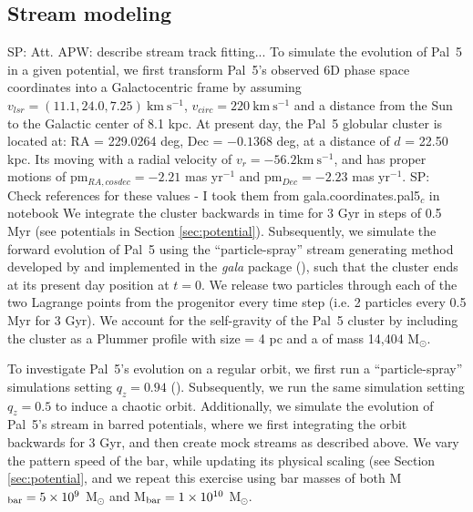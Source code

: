 \documentclass[twocolumn]{aastex62}
\newcommand{\package}[1]{\textsl{#1}}
\newcommand{\msun}{\textrm{M}_\odot}
\newcommand{\kms}{\ensuremath{\textrm{km}~\textrm{s}^{-1}}}
\newcommand{\sa}[1]{{\color{magenta} SP: #1}}
\begin{document}
\subsection{Stream modeling}
\label{sec:modeling}
\sa{Att. APW: describe stream track fitting...}
To simulate the evolution of Pal~5 in a given potential, we first transform Pal~5's observed 6D phase space coordinates into a Galactocentric frame by assuming $v_{lsr} = (11.1, 24.0, 7.25) ~\kms$,  $v_{circ} = 220  ~\kms$ and a distance from the Sun to the Galactic center of 8.1 kpc.
At present day, the Pal~5 globular cluster is located at: RA = 229.0264 deg, Dec = $-0.1368$ deg, at a distance of $d$ = 22.50 kpc. Its moving with a radial velocity of $v_r = -56.2 \kms$, and has proper motions of pm$_{RA,cosdec}= -2.21$ mas yr$^{-1}$ and pm$_{Dec} = -2.23$ mas yr$^{-1}$. \sa{Check references for these values - I took them from gala.coordinates.pal5$_c$ in notebook}
We integrate the cluster backwards in time for 3 Gyr in steps of 0.5 Myr (see potentials in Section \ref{sec:potential}).
Subsequently, we simulate the forward evolution of Pal~5 using the ``particle-spray'' stream generating method developed by \citet{Fardal:2015} and implemented in the \package{gala} package (\citealt{gala}), such that the cluster ends at its present day position at $t = 0$. We release two particles through each of the two Lagrange points from the progenitor every time step (i.e. 2 particles every 0.5 Myr for 3 Gyr). We account for the self-gravity of the Pal~5 cluster by including the cluster as a Plummer profile with size = 4 pc and a of mass 14,404 M$_{\odot}$. 

To investigate Pal~5's evolution on a regular orbit, we first run a ``particle-spray'' simulations setting $q_z = 0.94$ (\citealt{Bovy:2016}).
Subsequently, we run the same simulation setting $q_z = 0.5$ to induce a chaotic orbit.
Additionally, we simulate the evolution of Pal~5's stream in barred potentials, where we first integrating the orbit backwards for 3 Gyr, and then create mock streams as described above.
We vary the pattern speed of the bar, while updating its physical scaling (see Section \ref{sec:potential}, %
and we repeat this exercise using bar masses of both M$_{\rm bar} = 5 \times 10^{9}$ $\msun$ and M$_{\rm bar} = 1 \times 10^{10}$ $\msun$.
\end{document}
